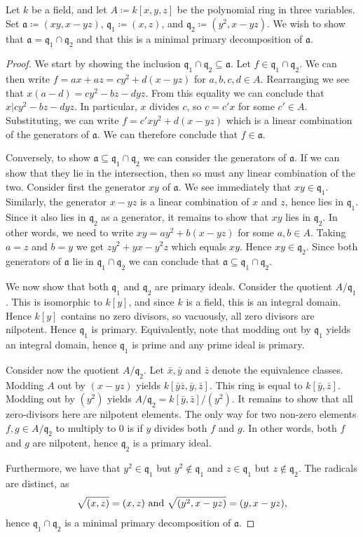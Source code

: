 \documentclass{article}
\newcommand{\q}{\mathfrak{q}}
\renewcommand{\a}{\mathfrak{a}}
\newcommand{\rad}[1]{\sqrt{#1}}
\begin{document}
Let $k$ be a field, and let $A \coloneqq k[x, y, z]$ be the polynomial
ring in three variables. Set $\a \coloneqq (xy, x-yz)$, $\q_1 \coloneqq
(x, z)$, and $\q_2 \coloneqq (y^2, x-yz)$. We wish to show that $\a = \q_1
\cap \q_2$ and that this is a minimal primary decomposition of $\a$.
\begin{proof}
    We start by showing the inclusion $\q_1 \cap \q_2 \subseteq \a$. Let $f \in
    \q_1 \cap \q_2$. We can then write $f = ax + az = cy^2 + d(x - yz)$ for $a,
    b, c, d \in A$.  Rearranging we see that $x(a - d) = cy^2 - bz - dyz$. From
    this equality we can conclude that $x | cy^2 - bz - dyz$. In particular,
    $x$ divides $c$, so $c = c'x$ for some $c' \in A$. Substituting, we can
    write $f = c'xy^2 + d(x - yz)$ which is a linear combination of the
    generators of $\a$. We can therefore conclude that $f \in \a$.

    Conversely, to show $\a \subseteq \q_1 \cap \q_2$ we can consider the
    generators of $\a$. If we can show that they lie in the intersection, then
    so must any linear combination of the two. Consider first the generator
    $xy$ of $\a$. We see immediately that $xy \in \q_1$. Similarly, the
    generator $x - yz$ is a linear combination of $x$ and $z$, hence lies in
    $\q_1$. Since it also lies in $\q_2$ as a generator, it remains to show
    that $xy$ lies in $\q_2$. In other words, we need to write $xy = ay^2 + b(x
    - yz)$ for some $a, b \in A$. Taking $a = z$ and $b = y$ we get $zy^2 + yx
    - y^2z$ which equals $xy$. Hence $xy \in \q_2$. Since both generators of
    $\a$ lie in $\q_1 \cap \q_2$ we can conclude that $\a \subseteq \q_1 \cap
    \q_2$.

    We now show that both $\q_1$ and $\q_2$ are primary ideals. Consider the
    quotient $A / \q_1$. This is isomorphic to $k[y]$, and since $k$ is a
    field, this is an integral domain. Hence $k[y]$ contains no zero divisors,
    so vacuously, all zero divisors are nilpotent. Hence $\q_1$ is primary.
    Equivalently, note that modding out by $\q_1$ yields an integral domain,
    hence $\q_1$ is prime and any prime ideal is primary.
    
    Consider now the quotient $A / \q_2$. Let $\bar{x}, \bar{y}$ and $\bar{z}$
    denote the equivalence classes. Modding $A$ out by $(x-yz)$ yields
    $k[\bar{y}\bar{z}, \bar{y}, \bar{z}]$. This ring is equal to $k[\bar{y},
    \bar{z}]$. Modding out by $(y^2)$ yields $A / \q_2 = k[\bar{y}, \bar{z}] /
    (y^2)$. It remains to show that all zero-divisors here are nilpotent
    elements. The only way for two non-zero elements $f, g \in A/\q_2$ to
    multiply to $0$ is if $y$ divides both $f$ and $g$. In other words, both
    $f$ and $g$ are nilpotent, hence $\q_2$ is a primary ideal.
    
    Furthermore, we have that $y^2 \in \q_1$ but $y^2 \notin \q_1$ and $z \in
    \q_1$ but $z \notin \q_2$. The radicals are distinct, as
    \begin{align*}
        \notag
        \rad{(x, z)} = (x,z) \text{ and } \rad{(y^2, x - yz)} = (y, x - yz),
    \end{align*}
    hence $\q_1\cap\q_2$ is a minimal primary decomposition of $\a$.
\end{proof}
\end{document}
